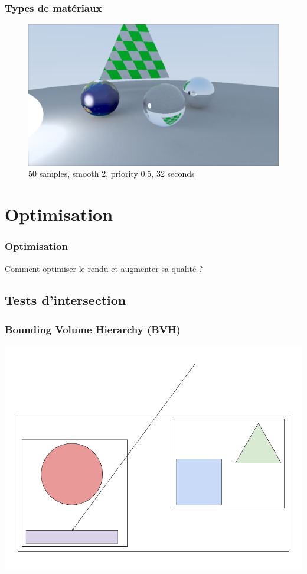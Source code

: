\documentclass[handout]{beamer}
\begin{document}
\begin{frame}
    \frametitle{Types de matériaux}

    \begin{figure}
        \includegraphics[scale=0.25]{material.png}
        \caption{50 samples, smooth 2, priority 0.5, 32 seconds}
    \end{figure}

\end{frame}

\section{Optimisation}

\begin{frame}

    \frametitle{Optimisation}

    Comment optimiser le rendu et augmenter sa qualité ?
    
\end{frame}

\subsection{Tests d'intersection}

\begin{frame}
    \frametitle{Bounding Volume Hierarchy (BVH)}
    \includegraphics[scale=0.3]{Arbre.png}
\end{frame}
\end{document}

